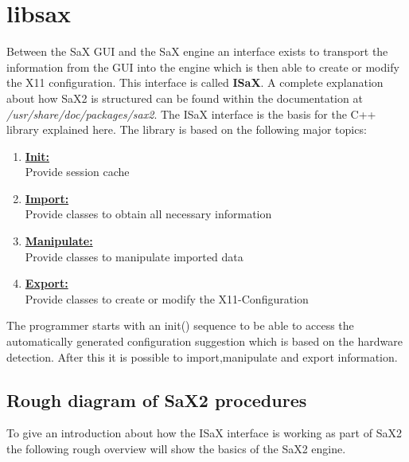 \chapter{libsax}
\label{cha:libsax}
\minitoc

Between the SaX GUI and the SaX engine an interface exists to
transport the information from the GUI into the engine which
is then able to create or modify the X11 configuration. This
interface is called \textbf{ISaX}. A complete explanation about
how SaX2 is structured can be found within the documentation
at \textit{/usr/share/doc/packages/sax2}. 
The ISaX interface is the basis for the C++ library explained here.
The library is based on the following major topics:

\begin{enumerate}
\item \textbf{\underline{Init:}}\\
      Provide session cache
\item \textbf{\underline{Import:}}\\
      Provide classes to obtain all necessary information
\item \textbf{\underline{Manipulate:}}\\
      Provide classes to manipulate imported data
\item \textbf{\underline{Export:}}\\
      Provide classes to create or modify the X11-Configuration
\end{enumerate}

The programmer starts with an init() sequence to be able to
access the automatically generated configuration suggestion which is
based on the hardware detection. After this it is possible to
import,manipulate and export information.

\section{Rough diagram of SaX2 procedures}
To give an introduction about how the ISaX interface is working
as part of SaX2 the following rough overview will show the basics
of the SaX2 engine.

\newpage

